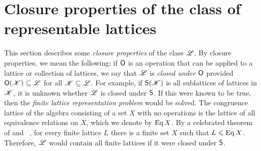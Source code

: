 
\section{Closure properties of the class of representable lattices}
\label{sec:clos-prop-class}
This section describes some
\emph{closure properties}
of the class $\mathscr{L}$. %
By closure properties, we mean the following: if $\mathsf{O}$ is an operation that can
be applied to a lattice or collection of lattices, we say that $\mathscr{L}$ is
\emph{closed under $\mathsf{O}$} provided $\mathsf{O}(\mathscr{K}) \subseteq \mathscr{L}$ for all 
$\mathscr{K}\subseteq \mathscr{L}$. For example, if 
$\mathsf{S}(\mathscr{K})$ is all sublattices of lattices in $\mathscr{K}$, 
it is unknown whether $\mathscr{L}$ is closed under $\mathsf{S}$.  
If this were known to be true, then the 
\emph{finite lattice representation problem} would be solved.
The congruence lattice of the algebra consisting of a
set $X$ with no operations is the lattice of all equivalence relations on $X$,
which we denote by $\operatorname{Eq} X$.
By a celebrated theorem of \Pudlak and \Tuma~\cite{Pudlak:1980}, for every finite
lattice $L$ there is a finite set $X$ such that $L\leqslant \operatorname{Eq} X$.  Therefore, $\mathscr{L}$
would contain all finite lattices if it were closed under $\mathsf{S}$.


